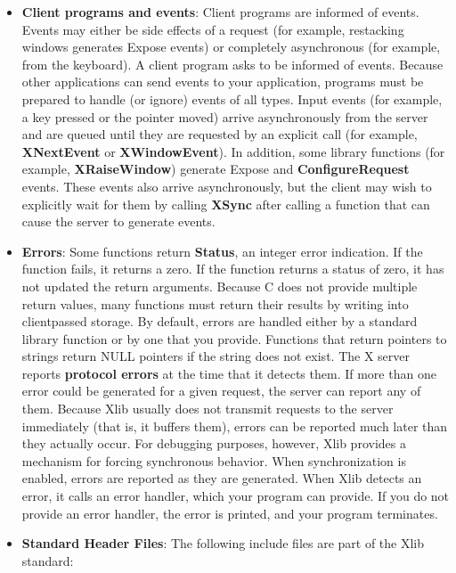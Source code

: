 \documentclass{report}
\begin{document}
\begin{itemize}
        \item \textbf{Client programs and events}: Client programs are informed of events. Events may either be side effects of a request (for example, restacking windows generates Expose events) or completely asynchronous (for example, from the keyboard). A client program asks to be informed of events. Because other applications can send events to your application, programs must be prepared to handle (or ignore) events of all types.
            \bigbreak \noindent 
            Input events (for example, a key pressed or the pointer moved) arrive asynchronously from the server and are queued until they are requested by an explicit call (for example, \textbf{XNextEvent} or \textbf{XWindowEvent}). In addition, some library functions (for example, \textbf{XRaiseWindow}) generate Expose and \textbf{ConfigureRequest} events. These events also arrive asynchronously, but the client may wish to explicitly wait for them by calling \textbf{XSync} after calling a function that can cause the server to generate events.
        \item \textbf{Errors}: Some functions return \textbf{Status}, an integer error indication. If the function fails, it returns a zero. If the function returns a status of zero, it has not updated the return arguments. Because C does not provide multiple return values, many functions must return their results by writing into clientpassed storage. By default, errors are handled either by a standard library function or by one that you provide. Functions that return pointers to strings return NULL pointers if the string does not exist.
            \bigbreak \noindent 
            The X server reports \textbf{protocol errors} at the time that it detects them. If more than one error could be generated for a given request, the server can report any of them.
            \bigbreak \noindent 
            Because Xlib usually does not transmit requests to the server immediately (that is, it buffers them), errors can be reported much later than they actually occur. For debugging purposes, however, Xlib provides a mechanism for forcing synchronous behavior. When synchronization is enabled, errors are reported as they are generated.
            \bigbreak \noindent 
            When Xlib detects an error, it calls an error handler, which your program can provide. If you do not provide an error handler, the error is printed, and your program terminates.
        \item \textbf{Standard Header Files}: The following include files are part of the Xlib standard:

\end{itemize}
\end{document}
